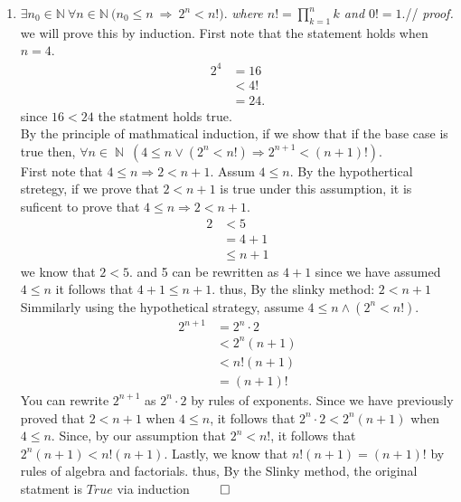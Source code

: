 \documentclass[11pt]{article}
\numberwithin{equation}{section}
\DeclareMathOperator*{\+}{\oplus}
\DeclareMathOperator*{\N}{\mathbb{N}}
\begin{document}
 \begin{enumerate}[label= 2.\arabic*), itemsep=0.4cm]
  \item %
    $ \exists n_0 \in \mathbb{N} \  \forall n \in \mathbb{N} \ \Big (n_0 \leq n \ \Rightarrow \ 2^n < n! \Big )$. \textit{where $n! = \prod\limits_{k=1}^n k$ and $0!=1$}.//
    \textit{proof.} we will prove this by induction. First note that the statement holds when $n=4$. 
    \begin{align*}
      2^4 &= 16 \\
          &< 4!\\
          &= 24.
    \end{align*}
    since $16 < 24$ the statment holds true. \\
    By the principle of mathmatical induction, if we show that if the base case is true then, $\forall n \in \N \ (4 \leq n \lor (2^n < n!) \Rightarrow 2^{n+1} < (n+1)!)$. \\
    First note that $4 \leq n \Rightarrow 2 < n +1$. Assum $4 \leq n$. By the hypothertical stretegy, if we prove that $2 < n+1$ is true under this assumption, it is suficent to prove that $4 \leq n \Rightarrow 2 < n +1$.
    \begin{align*}
      2 &< 5\\
        &= 4 +1 \\ 
        &\leq n + 1
    \end{align*}
    we know that $2<5$. and 5 can be rewritten as $4+1$ since we have assumed $4 \leq n$ it follows that $4+1 
    \leq n+1$. thus, By the slinky method: $2 < n+1$
    Simmilarly using the hypothetical strategy, assume $4 \leq n \land (2^n < n!)$. 
    \begin {align*}
      2^{n+1} &= 2^n \cdot 2\\
              &< 2^n (n+1)\\
              &< n! (n+1)\\
              &=(n+1)!
    \end {align*}
    You can rewrite $2^{n+1}$ as $2^n \cdot 2$ by rules of exponents. Since we have previously proved that $2<n+1$ when $4\leq n$, it follows that $2^n\cdot 2< 2^n(n+1)$ when $4 \leq n$. Since, by our assumption that $2^n < n!$, it follows that $2^n(n+1) < n! (n+1).$ Lastly, we know that $n!(n+1) = (n+1)!$ by rules of algebra and factorials. thus, By the Slinky method, the original statment is $True$ via induction $\qed$


\end{enumerate}
\end{document}
